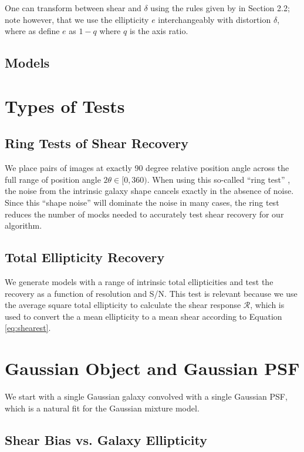 \documentclass[12pt,preprint]{aastex}
\newcommand{\Rshear}{\ensuremath{\mathcal{R}}}
\begin{document}
One can transform between shear and $\delta$ using the rules given by
\citet{bern02} in Section 2.2; note however, that we use the ellipticity 
$e$ interchangeably with distortion $\delta$, where as \citet{bern02} define
$e$ as $1-q$ where $q$ is the axis ratio.

\subsection{Models}

\section{Types of Tests}

\subsection{Ring Tests of Shear Recovery}

We place pairs of images at exactly 90 degree relative position angle across
the full range of position angle $2 \theta \in [0,360)$.  When using this
so-called ``ring test'' \citep{Nakajima2007}, the noise from the intrinsic
galaxy shape cancels exactly in the absence of noise.  Since this ``shape
noise'' will dominate the noise in many cases, the ring test reduces the number
of mocks needed to accurately test shear recovery for our algorithm.

\subsection{Total Ellipticity Recovery}

We generate models with a range of intrinsic total ellipticities and test the
recovery as a function of resolution and S/N.  This test is relevant because we
use the average square total ellipticity to calculate the shear response
\Rshear, which is used to convert the a mean ellipticity to a
mean shear according to Equation \ref{eq:shearest}.

\section{Gaussian Object and Gaussian PSF}

We start with a single Gaussian galaxy convolved with a single Gaussian PSF,
which is a natural fit for the Gaussian mixture model.  

\subsection{Shear Bias vs. Galaxy Ellipticity}
\end{document}
